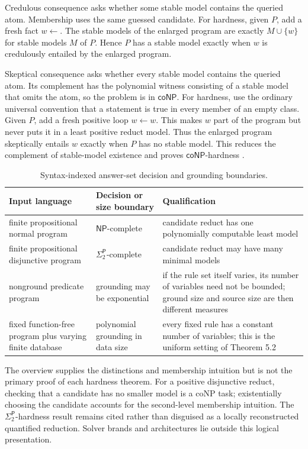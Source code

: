 Credulous consequence asks whether some stable model contains the queried
atom.  Membership uses the same guessed candidate.  For hardness, given \(P\),
add a fresh fact \(w\leftarrow\).  The stable models of the enlarged program
are exactly \(M\cup\{w\}\) for stable models \(M\) of \(P\).  Hence \(P\) has a
stable model exactly when \(w\) is credulously entailed by the enlarged
program.

Skeptical consequence asks whether every stable model contains the queried
atom.  Its complement has the polynomial witness consisting of a stable model
that omits the atom, so the problem is in \(\mathsf{coNP}\).  For hardness, use
the ordinary universal convention that a statement is true in every member of
an empty class.  Given \(P\), add a fresh positive loop
\(w\leftarrow w\).  This makes \(w\) part of the program but never puts it in a
least positive reduct model.  Thus the enlarged program skeptically entails
\(w\) exactly when \(P\) has no stable model.  This reduces the complement of
stable-model existence and proves \(\mathsf{coNP}\)-hardness
\cite{DantsinEiterGottlobVoronkov2001}.

\begin{table}[htbp]
\centering\scriptsize
\begin{tabularx}{\textwidth}{@{}l X X@{}}
\toprule
Input language & Decision or size boundary & Qualification \\
\midrule
finite propositional normal program & \(\mathsf{NP}\)-complete &
candidate reduct has one polynomially computable least model \\
finite propositional disjunctive program &
\(\Sigma^{\mathsf P}_2\)-complete &
candidate reduct may have many minimal models \\
nonground predicate program & grounding may be exponential &
if the rule set itself varies, its number of variables need not be bounded;
ground size and source size are then different measures \\
fixed function-free program plus varying finite database & polynomial grounding
in data size & every fixed rule has a constant number of variables; this is the
uniform setting of Theorem 5.2 \\
\bottomrule
\end{tabularx}
\caption{Syntax-indexed answer-set decision and grounding boundaries.}
\label{tab:p09-asp-complexity}
\end{table}

The overview supplies the distinctions and membership intuition but is not the
primary proof of each hardness theorem.  For a positive disjunctive reduct,
checking that a candidate has no smaller model is a coNP task; existentially
choosing the candidate accounts for the second-level membership intuition.
The \(\Sigma^{\mathsf P}_2\)-hardness result remains cited rather than disguised
as a locally reconstructed quantified reduction.  Solver brands and
architectures lie outside this logical presentation.
